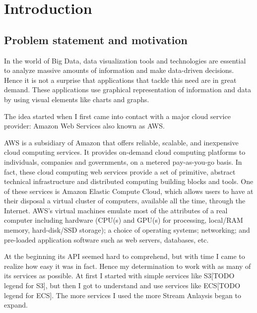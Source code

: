 \chapter{Introduction}
\label{chap:01}

\section{Problem statement and motivation}
\label{chap:01:01}
In the world of Big Data, data visualization tools and technologies are essential to analyze massive amounts of information and make data-driven decisions. Hence it is not a surprise that applications that tackle this need are in great demand. These applications use graphical representation of information and data by using visual elements like charts and graphs.

The idea started when I first came into contact with a major cloud service provider: Amazon Web Services also known as AWS.

AWS is a subsidiary of Amazon that offers reliable, scalable, and inexpensive cloud computing services. It provides on-demand cloud computing platforms to individuals, companies and governments, on a metered pay-as-you-go basis. In fact, these cloud computing web services provide a set of primitive, abstract technical infrastructure and distributed computing building blocks and tools. One of these services is Amazon Elastic Compute Cloud, which allows users to have at their disposal a virtual cluster of computers, available all the time, through the Internet. AWS's virtual machines emulate most of the attributes of a real computer including hardware (CPU(s) and GPU(s) for processing, local/RAM memory, hard-disk/SSD storage); a choice of operating systems; networking; and pre-loaded application software such as web servers, databases, etc. \cite{aws-overview}

At the beginning its API seemed hard to comprehend, but with time I came to realize how easy it was in fact. Hence my determination to work with as many of its services as possible. At first I started with simple services like S3[TODO legend for S3], but then I got to understand and use services like ECS[TODO legend for ECS]. The more services I used the more Stream Anlaysis began to expand.



